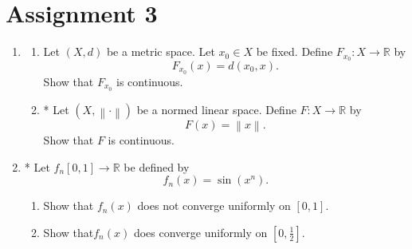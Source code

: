 \documentclass[notoc,notitlepage]{tufte-book}
\newcommand{\norm}[1]{\left\| #1 \right\|}
\begin{document}

\chapter{Assignment 3}%
\label{chp:assignment_3}

\begin{enumerate}
  \item \begin{enumerate}
    \item Let $(X, d)$ be a metric space. Let $x_0 \in X$ be fixed. Define $F_{x_0} : X \to \mathbb{R}$ by
      \begin{equation*}
        F_{x_0}(x) = d(x_0, x).
      \end{equation*}
      Show that $F_{x_0}$ is continuous.
    \item * Let $(X, \norm\cdot)$ be a normed linear space. Define $F : X \to \mathbb{R}$ by
      \begin{equation*}
        F(x) = \norm{x}.
      \end{equation*}
      Show that $F$ is continuous.
    \end{enumerate}

  \item * Let $f_n [ 0, 1 ] \to \mathbb{R}$ be defined by
    \begin{equation*}
      f_n(x) = \sin(x^n).
    \end{equation*}
    \begin{enumerate}
      \item Show that $f_n(x)$ does not converge uniformly on $[0, 1]$.
      \item Show that$f_n(x)$ does converge uniformly on $\left[0, \frac{1}{2}\right]$.
    \end{enumerate}


\end{enumerate}
\end{document}
